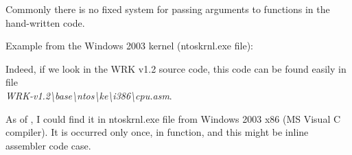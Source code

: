 \par
Commonly there is no fixed system for passing arguments to functions in the hand-written code.

\par
Example from the Windows 2003 kernel 
(ntoskrnl.exe file):



Indeed, if we look in the 
\ac{WRK} v1.2 source code, this code
can be found easily in file \\
\emph{WRK-v1.2\textbackslash{}base\textbackslash{}ntos\textbackslash{}ke\textbackslash{}i386\textbackslash{}cpu.asm}.

\par 
As of , I could find it in ntoskrnl.exe file from Windows 2003 x86 (MS Visual C compiler).
It is occurred only once, in  function, and this might be inline assembler code case.

